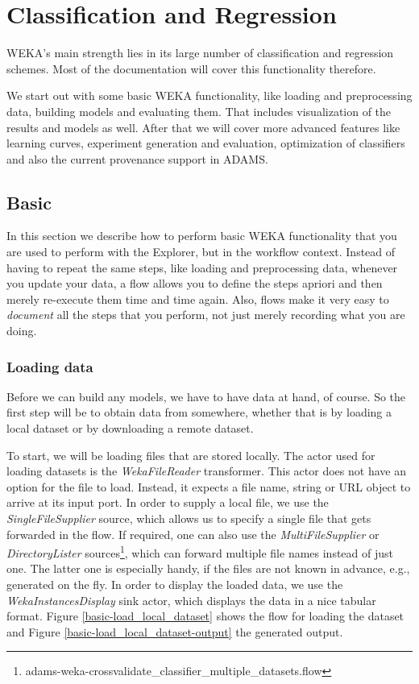 %

\chapter{Classification and Regression}
\label{classification_and_regression}
WEKA's main strength lies in its large number of classification and regression
schemes. Most of the documentation will cover this functionality therefore.

We start out with some basic WEKA functionality, like loading and
preprocessing data, building models and evaluating them. That includes
visualization of the results and models as well. After that we will cover more
advanced features like learning
curves, experiment generation and evaluation, optimization of classifiers and
also the current provenance support in ADAMS.

\newpage
\section{Basic}
In this section we describe how to perform basic WEKA functionality that you are
used to perform with the Explorer, but in the workflow context. Instead of
having to repeat the same steps, like loading and preprocessing data, whenever
you update your data, a flow allows you to define the steps apriori and then merely
re-execute them time and time again. Also, flows make it very easy to
\textit{document} all the steps that you perform, not just merely recording what
you are doing.

\subsection{Loading data}
Before we can build any models, we have to have data at hand, of course. So the
first step will be to obtain data from somewhere, whether that is by loading a
local dataset or by downloading a remote dataset.

To start, we will be loading files that are stored locally. The actor used for
loading datasets is the \textit{WekaFileReader} transformer. This actor does not
have an option for the file to load. Instead, it expects a file name, string or
URL object to arrive at its input port. In order to supply a local file, we use
the \textit{SingleFileSupplier} source, which allows us to specify a single file
that gets forwarded in the flow. If required, one can also use the
\textit{MultiFileSupplier} or \textit{DirectoryLister}
sources\footnote{adams-weka-crossvalidate\_classifier\_multiple\_datasets.flow},
which can forward multiple file names instead of just one. The latter one is
especially handy, if the files are not known in advance, e.g., generated on the
fly. In order to display the loaded data, we use the
\textit{WekaInstancesDisplay} sink actor, which displays the data in a nice
tabular format. Figure \ref{basic-load_local_dataset} shows the flow for loading
the dataset and Figure \ref{basic-load_local_dataset-output} the generated
output.

